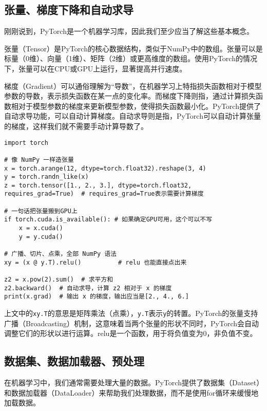 \documentclass[../main.tex]{subfiles}
\begin{document}
\subsection{张量、梯度下降和自动求导}

刚刚说到，PyTorch是一个机器学习库，因此我们至少应当了解这些基本概念。

张量（Tensor）是PyTorch的核心数据结构，类似于NumPy中的数组。张量可以是标量（0维）、向量（1维）、矩阵（2维）或更高维度的数组。使用PyTorch的情况下，张量可以在CPU或GPU上运行，显著提高并行速度。

梯度（Gradient）可以通俗理解为“导数”，在机器学习上特指损失函数相对于模型参数的导数，表示损失函数在某一点的变化率。而梯度下降则指，通过计算损失函数相对于模型参数的梯度来更新模型参数，使得损失函数最小化。PyTorch提供了自动求导功能，可以自动计算梯度。自动求导则是指，PyTorch可以自动计算张量的梯度，这样我们就不需要手动计算导数了。

\begin{lstlisting}
import torch

# 像 NumPy 一样造张量
x = torch.arange(12, dtype=torch.float32).reshape(3, 4)
y = torch.randn_like(x)
z = torch.tensor([1., 2., 3.], dtype=torch.float32, requires_grad=True)  # requires_grad=True表示需要计算梯度

# 一句话把张量搬到GPU上
if torch.cuda.is_available(): # 如果确定GPU可用，这个可以不写
    x = x.cuda()
    y = y.cuda()

# 广播、切片、点乘，全部 NumPy 语法
xy = (x @ y.T).relu()          # relu 也能直接点出来

z2 = x.pow(2).sum()  # 求平方和
z2.backward()  # 自动求导，计算 z2 相对于 x 的梯度
print(x.grad)  # 输出 x 的梯度，输出应当是[2., 4., 6.]

\end{lstlisting}

上文中的\texttt{x\@ y.T}的意思是矩阵乘法（点乘），\texttt{y.T}表示\texttt{y}的转置。PyTorch的张量支持广播（Broadcasting）机制，这意味着当两个张量的形状不同时，PyTorch会自动调整它们的形状以进行运算。relu是一个函数，用于将负值变为0，非负值不变。

\subsection{数据集、数据加载器、预处理}

在机器学习中，我们通常需要处理大量的数据。PyTorch提供了数据集（Dataset）和数据加载器（DataLoader）来帮助我们处理数据，而不是使用for循环来缓慢地加载数据。
\end{document}
